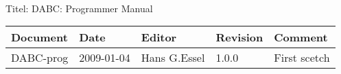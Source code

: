 \\Titel: DABC: Programmer Manual
\begin{table}[h]
\begin{tabular}{|p{2.8cm}|p{2.0cm}|p{3.0cm}|p{1.6cm}|p{5.0cm}|} \hline
Document   & Date        & Editor       & Revision & Comment \\
\hline DABC-prog & 2009-01-04 & Hans G.Essel & 1.0.0      &
First scetch \\ \hline
\end{tabular}
\end{table}
